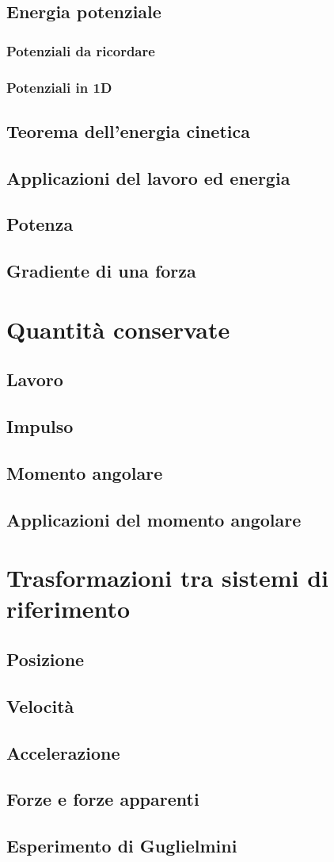 \documentclass[a4paper]{article}
\begin{document}
\subsection{Energia potenziale}
\subsubsection*{Potenziali da ricordare}
\subsubsection*{Potenziali in 1D}
\subsection{Teorema dell'energia cinetica}
\subsection{Applicazioni del lavoro ed energia}
\subsection{Potenza}
\subsection{Gradiente di una forza}

\section{Quantità conservate}
\subsection{Lavoro}
\subsection{Impulso}
\subsection{Momento angolare}
\subsection{Applicazioni del momento angolare}

\section{Trasformazioni tra sistemi di riferimento}
\subsection{Posizione}
\subsection{Velocità}
\subsection{Accelerazione}
\subsection{Forze e forze apparenti}
\subsection{Esperimento di Guglielmini}
\end{document}
